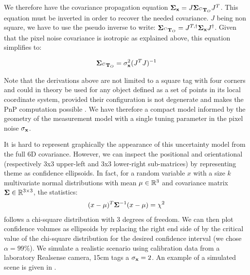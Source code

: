 We therefore have the covariance propagation equation ${\bm \Sigma}_{{\bf x}} = J {\bm \Sigma}_{\prescript{C}{}{{\bf T}}_{O}} J^T$. 
This equation must be inverted in order to recover the needed covariance. $J$ being non square, 
we have to use the pseudo inverse to write: ${\bm \Sigma}_{\prescript{C}{}{{\bf T}}_{O}} = J^{T,\dagger} {\bm \Sigma}_{{\bf x}} J^{\dagger}$. 
Given that the pixel noise covariance is isotropic as explained above, this equation simplifies to:

\begin{equation}
{\bm \Sigma}_{\prescript{C}{}{{\bf T}}_{O}} = \sigma_{{\bf x}}^2(J^T J)^{-1}    
\end{equation}

Note that the derivations above are not limited to a square tag with four corners and could in theory be used for any object defined as
a set of points in its local coordinate system, provided their configuration is not degenerate and makes the PnP computation possible \cite{gao2003complete}.  
We have therefore a compact model informed by the geometry of the measurement model with  a single tuning parameter in the pixel noise $\sigma_{\bf x}$.

It is hard to represent graphically the appearance of this uncertainty model from the full 6D covariance. However, we can inspect the positional and orientational
(respectively 3x3 upper-left and 3x3 lower-right sub-matrices) by representing theme as confidence ellipsoids.
In fact, for a random variable $x$ with a size $k$ multivariate normal distributions with mean $\mu \in \mathbb{R}^3$ and 
covariance matrix ${\bm \Sigma} \in \mathbb{R}^{3 \times 3}$, the statistics:
%
\begin{equation}
    (x - \mu)^T {\bm \Sigma}^{-1}(x - \mu) = \chi^2
    \label{eq:chi2}
\end{equation}
%
follows a chi-square distribution with 3 degrees of freedom. We can then plot confidence volumes as ellipsoids by replacing the right end side of  
 by the critical value of the chi-square distribution for the desired confidence interval (we chose $\alpha=99\%$). We simulate a 
realistic scenario using calibration data from a laboratory Realsense camera, 15cm tags a $\sigma_{\bf x} = 2$. An example of a simulated scene is given
in . 


